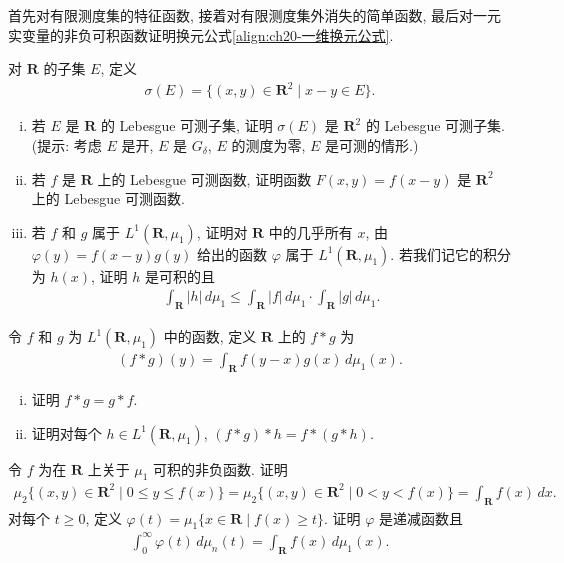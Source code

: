 \documentclass[../../main.tex]{subfiles}
\begin{document}
\begin{exercise}\label{exercise:ch20-31}
首先对有限测度集的特征函数, 接着对有限测度集外消失的简单函数, 最后对一元实变量的非负可积函数证明换元公式\eqref{align:ch20-一维换元公式}.
\end{exercise}

\begin{exercise}\label{exercise:ch20-32}
对 $\mathbf{R}$ 的子集 $E$, 定义
\begin{align*}
\sigma(E)=\{(x,y)\in\mathbf{R}^{2}\mid x-y\in E\}.
\end{align*}
\begin{enumerate}[(i)]
\item 若 $E$ 是 $\mathbf{R}$ 的 Lebesgue 可测子集, 证明 $\sigma(E)$ 是 $\mathbf{R}^{2}$ 的 Lebesgue 可测子集. (提示: 考虑 $E$ 是开, $E$ 是 $G_{\delta}$, $E$ 的测度为零, $E$ 是可测的情形.)
\item 若 $f$ 是 $\mathbf{R}$ 上的 Lebesgue 可测函数, 证明函数 $F(x,y)=f(x-y)$ 是 $\mathbf{R}^{2}$ 上的 Lebesgue 可测函数.
\item 若 $f$ 和 $g$ 属于 $L^{1}(\mathbf{R},\mu_{1})$, 证明对 $\mathbf{R}$ 中的几乎所有 $x$, 由 $\varphi(y)=f(x-y)g(y)$ 给出的函数 $\varphi$ 属于 $L^{1}(\mathbf{R},\mu_{1})$. 若我们记它的积分为 $h(x)$, 证明 $h$ 是可积的且
\begin{align*}
\int_{\mathbf{R}}|h|\,d\mu_{1}\leqslant\int_{\mathbf{R}}|f|\,d\mu_{1}\cdot\int_{\mathbf{R}}|g|\,d\mu_{1}.
\end{align*}
\end{enumerate}
\end{exercise}

\begin{exercise}\label{exercise:ch20-33}
令 $f$ 和 $g$ 为 $L^{1}(\mathbf{R},\mu_{1})$ 中的函数, 定义 $\mathbf{R}$ 上的 $f*g$ 为
\begin{align*}
(f*g)(y)=\int_{\mathbf{R}}f(y-x)g(x)\,d\mu_{1}(x).
\end{align*}
\begin{enumerate}[(i)]
\item 证明 $f*g=g*f$.
\item 证明对每个 $h\in L^{1}(\mathbf{R},\mu_{1})$, $(f*g)*h=f*(g*h)$.
\end{enumerate}
\end{exercise}

\begin{exercise}\label{exercise:ch20-34}
令 $f$ 为在 $\mathbf{R}$ 上关于 $\mu_{1}$ 可积的非负函数. 证明
\begin{align*}
\mu_{2}\{(x,y)\in\mathbf{R}^{2}\mid 0\leqslant y\leqslant f(x)\}=\mu_{2}\{(x,y)\in\mathbf{R}^{2}\mid 0<y<f(x)\}=\int_{\mathbf{R}}f(x)\,dx.
\end{align*}
对每个 $t\geqslant 0$, 定义 $\varphi(t)=\mu_{1}\{x\in\mathbf{R}\mid f(x)\geqslant t\}$. 证明 $\varphi$ 是递减函数且
\begin{align*}
\int_{0}^{\infty}\varphi(t)\,d\mu_{n}(t)=\int_{\mathbf{R}}f(x)\,d\mu_{1}(x).
\end{align*}
\end{exercise}
\end{document}
